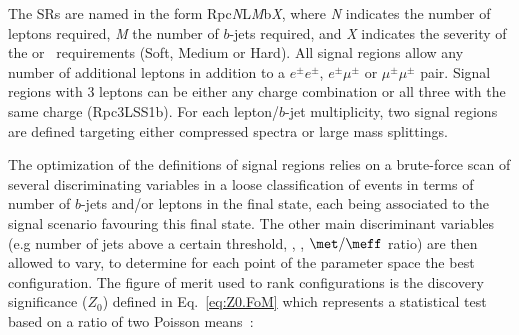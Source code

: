 \begin{table}[tbh!]
{}
\caption{
Summary of the signal region definitions. 
Requirements are placed on the number of signal leptons ($N_{\textrm{leptons}}^{\textrm{signal}}$) with $\pt>$20 \GeV~and a same sign (SS) pair (except for Rpc2Lsoft), the number of 
$b$-jets with $\pt>20 \GeV$ ($N_{b\textrm{-jets}}$), the number of jets ($N_{\textrm{jets}}$) above a certain \pt threshold ($\pt^{\textrm{jet}}$), 
\met, \meff\ and/or \met/\meff. 
The last column indicates the targeted signal model. 
}
\label{tab:SRdef3}
\end{table}

The SRs are named in the form Rpc\textit{N}L{\textit M}b{\textit X}, where {\textit N} indicates the number of leptons required, {\textit M} the number of $b$-jets required, and {\textit X} indicates the severity 
of the \met or \meff\ requirements (Soft, Medium or Hard). All signal regions allow any number of additional leptons in addition to a $e^\pm e^\pm$,
$e^\pm \mu^\pm$ or $\mu^\pm \mu^\pm$ pair. Signal regions with 3 leptons can be either any charge combination or all three with the same charge (Rpc3LSS1b).
For each lepton/$b$-jet multiplicity, two signal regions are defined targeting either compressed spectra or large mass splittings. 

The optimization of the definitions of signal regions relies on a brute-force
scan of several discriminating variables in a loose classification of events 
in terms of number of $b$-jets and/or leptons in the final state, each being 
associated to the signal scenario favouring this final state.
The other main discriminant variables (e.g number of jets above a certain \pt threshold, \meff, \met, $\met/\meff$ ratio) are then 
allowed to vary, 
to determine for each point of the parameter space the best configuration. 
The figure of merit used to rank configurations is the discovery significance ($Z_0$)
defined in Eq.~\ref{eq:Z0.FoM} which represents
a statistical test based on a ratio of two Poisson means~\cite{Cousins:2009}:

